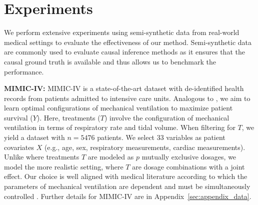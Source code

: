 \documentclass{article}
\theoremstyle{definition}
\theoremstyle{plain}
\begin{document}
\section{Experiments}\label{sec:experiments}

We perform extensive experiments using semi-synthetic data from real-world medical settings to evaluate the effectiveness of our method. Semi-synthetic data are commonly used to evaluate causal inference methods as it ensures that the causal ground truth is available \cite{Curth.2021, Xu.2021} and thus allows us to benchmark the performance. 

\textbf{MIMIC-IV:} MIMIC-IV \cite{Johnson.2023} is a state-of-the-art dataset with de-identified health records from patients admitted to intensive care units. Analogous to \cite{Schwab.2020}, we aim to learn optimal configurations of mechanical ventilation to maximize patient survival ($Y$). Here, treatments ($T$) involve the configuration of mechanical ventilation in terms of respiratory rate and tidal volume. When filtering for $T$, we yield a dataset with $n=5476$ patients. We select 33 variables as patient covariates $X$ (e.g., age, sex, respiratory measurements, cardiac measurements). Unlike \cite{Schwab.2020} where treatments $T$ are modeled as $p$ mutually exclusive dosages, we model the more realistic setting, where $T$ are dosage combinations with a joint effect. Our choice is well aligned with medical literature according to which the parameters of mechanical ventilation are dependent and must be simultaneously controlled \cite{Grasselli.2021}. Further details for MIMIC-IV are in Appendix~\ref{sec:appendix_data}.
\end{document}
